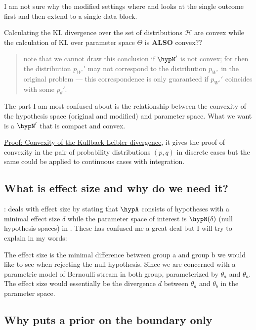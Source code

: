 I am not sure why the modified settings where \cite{turnerExactAnytimevalidConfidence2023} and \cite{turnerGenericEvariablesExact2024} looks at the single outcome first and then extend to a single data block.

Calculating the KL divergence over the set of distributions $\mathcal{H}$ are convex while the calculation of KL over parameter space $\Theta$ is \textbf{ALSO} convex??

\begin{quote}
	note that we cannot draw this conclusion if $\hypN'$ is not convex; for then the distribution $p_{W^\circ}'$ may not correspond to the distribution $p_{W^\circ}$ in the original problem — this correspondence is only guaranteed if $p_{W^\circ}'$ coincides with some $p_{\theta}'$.
\end{quote}

The part I am most confused about is the relationship between the convexity of the hypothesis space (original and modified) and parameter space. What we want is a $\hypN'$ that is compact and convex.

\href{https://statproofbook.github.io/P/kl-conv.html}{Proof: Convexity of the Kullback-Leibler divergence}, it gives the proof of convexity in the pair of probability distributions $(p, q)$ in discrete cases but the same could be applied to continuous cases with integration.

\subsection{What is effect size and why do we need it?}:
\cite{turnerGenericEvariablesExact2024} deals with effect size by stating that $\hypA$ consists of hypotheses with a minimal effect size $\delta$ while the parameter space of interest is $\hypN(\delta)$ (null hypothesis spaces) in \cite{turnerExactAnytimevalidConfidence2023}. These has confused me a great deal but I will try to explain in my words:

The effect size is the minimal difference between group a and group b
we would like to see when rejecting the null hypothesis.
Since we are concerned with a parametric model of Bernoulli stream in both group,
parameterized by $\theta_a$ and $\theta_a$.
The effect size would essentially be the divergence $d$ between $\theta_a$ and $\theta_b$
in the parameter space.

\subsection{Why puts a prior on the boundary only}


